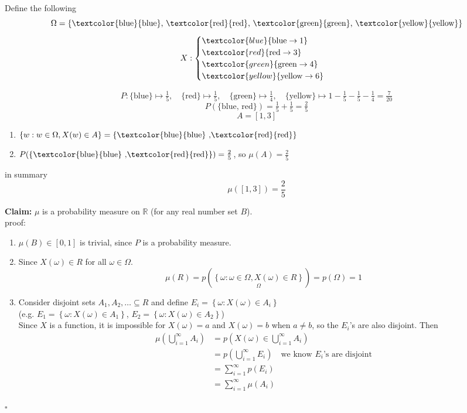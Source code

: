 \begin{example}[][3.2.1]
    Define the following
    \[\Omega = \left\{ \text{\textcolor{blue}{blue}, \textcolor{red}{red}, \textcolor{green}{green}, \textcolor{yellow}{yellow}} \right\} \]
    \[X: \begin{cases}
        \textcolor{blue}{\text{blue} \rightarrow 1} \\
        \textcolor{red}{\text{red} \rightarrow 3} \\
        \textcolor{green}{\text{green} \rightarrow 4} \\
        \textcolor{yellow}{\text{yellow} \rightarrow 6}
    \end{cases}\]

    \[P: \{\text{blue}\}\mapsto\tfrac{1}{5},\quad \{\text{red}\}\mapsto\tfrac{1}{5},\quad \{\text{green}\}\mapsto\tfrac{1}{4},\quad \{\text{yellow}\}\mapsto 1-\tfrac{1}{5}-\tfrac{1}{5}-\tfrac{1}{4}=\tfrac{7}{20}\]
    \[P(\{\text{blue, red}\}) = \tfrac{1}{5}+\tfrac{1}{5} = \tfrac{2}{5}\]
    \[A = [1,3] \]
    \begin{enumerate}
        \item $\left\{w: w \in \Omega, X(w) \in A \right\} = \left\{\text{\textcolor{blue}{blue} ,\textcolor{red}{red}}\right\}$
        \item $P(\left\{\text{\textcolor{blue}{blue} ,\textcolor{red}{red}}\right\}) = \frac{2}{5}$, so $\mu(A) = \frac{2}{5}$
    \end{enumerate}
    in summary
    \[\mu([1,3]) = \frac{2}{5}\]
\end{example}

\textbf{Claim:} $\mu$ is a probability measure on $\mathbb{R}$ (for any real number set $B$).
\\proof:
\begin{enumerate}
    \item $\mu(B) \in [0,1]$ is trivial, since $P$ is a probability measure.
    \item Since $X(\omega) \in R $ for all $\omega \in \Omega$.
    \[\mu(R) = p(\underset{\Omega}{ \left\{\omega : \omega \in \Omega, X(\omega)\in R\right\} }) = p(\Omega) = 1\]
    \item Consider disjoint sets $A_1, A_2, \dots \subseteq R$ and define $E_i = \left\{\omega: X(\omega) \in A_i\right\}$
    \\(e.g. $E_1 = \left\{\omega: X(\omega)\in A_1\right\}$, $E_2 = \left\{\omega: X(\omega)\in A_2\right\}$)
    \\Since $X$ is a function, it is impossible for $X(\omega) = a$ and $X(\omega) = b$ when $a\neq b$, so the $E_i$'s are also disjoint. Then
    \begin{align*}
        \mu\left(\bigcup_{i=1}^{\infty}A_i\right) &= p\left(X(\omega) \in \bigcup_{i=1}^{\infty}A_i\right) \\
        &= p\left(\bigcup_{i=1}^{\infty}E_i\right) \quad \text{we know } E_i\text{'s are disjoint} \\
        &= \sum_{i=1}^{\infty}p(E_i) \\
        &= \sum_{i=1}^{\infty}\mu(A_i)
    \end{align*}
\end{enumerate}
\hfill $\square$

